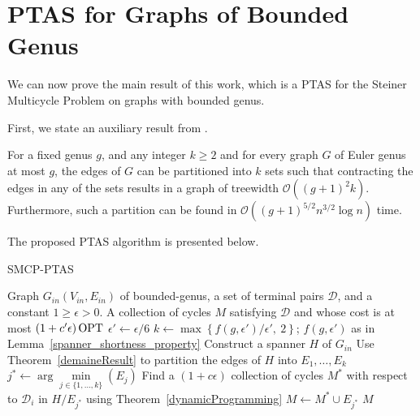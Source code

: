 \section{PTAS for Graphs of Bounded Genus}
\label{section:ptas_bounded_genus}

We can now prove the main result of this work, which is a PTAS for the Steiner Multicycle Problem on graphs with bounded genus.

First, we state an auxiliary result from \cite{Demaine2010}.

\begin{theorem} \label{demaineResult}
    For a fixed genus \(g\), and any integer \(k \geq 2\) and for every graph \(G\) of Euler genus at most \(g\), the edges of \(G\) can be partitioned into \(k\) sets such that contracting the edges in any of the sets results in a graph of treewidth \(\mathcal{O}((g + 1)^2k)\). Furthermore, such a partition can be found in \(\mathcal{O}((g+ 1)^{5/2} n^{3/2} \log{n})\) time.
\end{theorem}

The proposed PTAS algorithm is presented below.

\begin{algorithm}
\caption{SMCP-PTAS}
\label{smcp-ptas}
\begin{algorithmic}[1]

\Require Graph \(G_{in}(V_{in} , E_{in})\) of bounded-genus, a set of terminal pairs \(\mathcal{D}\), and a constant \(1 \geq \epsilon > 0\).
\Ensure A collection of cycles \(M\) satisfying \(\mathcal{D}\) and whose cost is at most \((1 + c' \epsilon) \operatorname{\textrm{OPT}}\)
\State  \(\epsilon' \gets \epsilon / 6\)
\State  \(k \gets \max\left \{ f(g, \epsilon')/{\epsilon'}, \: 2\right \}\); \(f(g, \epsilon')\) as in Lemma~\ref{spanner_shortness_property} \label{alg_smcp_ptas:k}
\State Construct a spanner \(H\) of \(G_{in}\) \label{alg_smcp_ptas:SpannerCall}
\State Use Theorem~\ref{demaineResult} to partition the edges of \(H\) into \(E_1, \dots, E_k\) \label{alg_smcp_ptas:partDemaine}
\State  \(j^\ast \gets \arg\min\limits_{j \in \{1,\ldots,k\}}(E_j)\)
\State Find a \((1 + c \epsilon)\) collection of cycles \(M^\ast\) with respect to \(\mathcal{D}_i\) in \(H/E_{j^\ast}\) using Theorem~\ref{dynamicProgramming} \label{alg_smcp_ptas:dp}
\State \(M \gets M^\ast \cup E_{j^\ast}\)
\State \Return  \(M\)

\end{algorithmic}
\end{algorithm}

